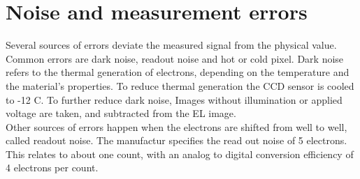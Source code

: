 \section{Noise and measurement errors}
Several sources of errors deviate the measured signal from the physical value. Common errors are dark noise, readout noise and hot or cold pixel. Dark noise refers to the thermal generation of electrons, depending on the temperature and the material's properties. To reduce thermal generation the CCD sensor is cooled to -12 C. To further reduce dark noise, Images without illumination or applied voltage are taken, and subtracted from the EL image.\\

Other sources of errors happen when the electrons are shifted from well to well, called readout noise. The manufactur specifies the read out noise of 5 electrons. This relates to about one count, with an analog to digital conversion efficiency of 4 electrons per count.\cite{ManualSensicam}
 